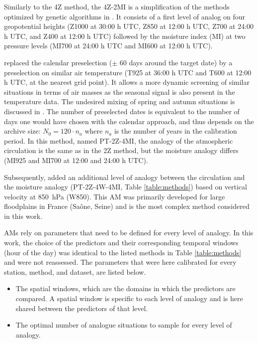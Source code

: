 \documentclass{ametsoc}
\begin{document}
Similarly to the 4Z method, the 4Z-2MI is a simplification of the methods optimized by genetic algorithms in \citet{Horton2017b}. It consists of a first level of analog on four geopotential heights (Z1000 at 30:00 h UTC, Z850 at 12:00 h UTC, Z700 at 24:00 h UTC, and Z400 at 12:00 h UTC) followed by the moisture index (MI) at two pressure levels (MI700 at 24:00 h UTC and MI600 at 12:00 h UTC).

\citet{BenDaoud2016} replaced the calendar preselection ($\pm$ 60 days around the target date) by a preselection on similar air temperature (T925 at 36:00 h UTC and T600 at 12:00 h UTC, at the nearest grid point). It allows a more dynamic screening of similar situations in terms of air masses as the seasonal signal is also present in the temperature data. The undesired mixing of spring and autumn situations is discussed in \citet{Caillouet2016}. The number of preselected dates is equivalent to the number of days one would have chosen with the calendar approach, and thus depends on the archive size: $N_{0} = 120 \cdot n_{a}$ where $n_{a}$ is the number of years in the calibration period. In this method, named PT-2Z-4MI, the analogy of the atmospheric circulation is the same as in the 2Z method, but the moisture analogy differs (MI925 and MI700 at 12:00 and 24:00 h UTC).

Subsequently, \citet{BenDaoud2016} added an additional level of analogy between the circulation and the moisture analogy (PT-2Z-4W-4MI, Table \ref{table:methods}) based on vertical velocity at 850~hPa (W850). This AM was primarily developed for large floodplains in France (Sa\^{o}ne, Seine) and is the most complex method considered in this work. 

AMs rely on parameters that need to be defined for every level of analogy. In this work, the choice of the predictors and their corresponding temporal windows (hour of the day) was identical to the listed methods in Table \ref{table:methods} and were not reassessed. The parameters that were here calibrated for every station, method, and dataset, are listed below.

\begin{itemize}
	\item The spatial windows, which are the domains in which the predictors are compared. A spatial window is specific to each level of analogy and is here shared between the predictors of that level.
	\item The optimal number of analogue situations to sample for every level of analogy.
\end{itemize}
\end{document}
